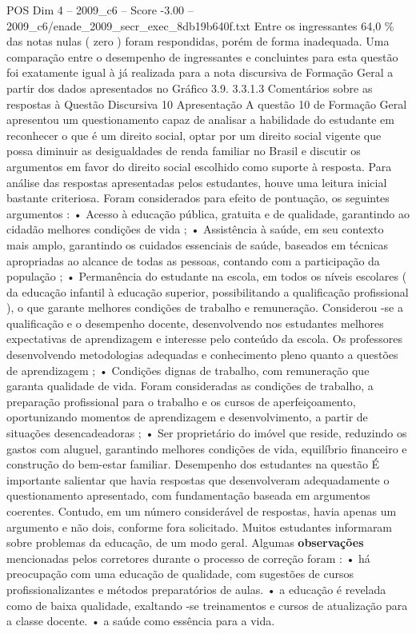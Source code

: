 \begin{textsample}{POS Dim 4 – 2009\_c6 – Score -3.00 – 2009\_c6/enade\_2009\_secr\_exec\_8db19b640f.txt}
Entre os ingressantes 64,0 \% das notas nulas ( zero ) foram respondidas, porém de forma inadequada.
Uma comparação entre o desempenho de ingressantes e concluintes para esta questão foi exatamente igual à já realizada para a nota discursiva de Formação Geral a partir dos dados apresentados no Gráfico 3.9. 3.3.1.3 Comentários sobre as respostas à Questão Discursiva 10 Apresentação A questão 10 de Formação Geral apresentou um questionamento capaz de analisar a habilidade do estudante em reconhecer o que é um direito social, optar por um direito social vigente que possa diminuir as desigualdades de renda familiar no Brasil e discutir os argumentos em favor do direito social escolhido como suporte à resposta.
Para análise das respostas apresentadas pelos estudantes, houve uma leitura inicial bastante criteriosa.
Foram considerados para efeito de pontuação, os seguintes argumentos : • Acesso à educação pública, gratuita e de qualidade, garantindo ao cidadão melhores condições de vida ; • Assistência à saúde, em seu contexto mais amplo, garantindo os cuidados essenciais de saúde, baseados em técnicas apropriadas ao alcance de todas as pessoas, contando com a participação da população ; • Permanência do estudante na escola, em todos os níveis escolares ( da educação infantil à educação superior, possibilitando a qualificação profissional ), o que garante melhores condições de trabalho e remuneração.
Considerou -se a qualificação e o desempenho docente, desenvolvendo nos estudantes melhores expectativas de aprendizagem e interesse pelo conteúdo da escola.
Os professores desenvolvendo metodologias adequadas e conhecimento pleno quanto a questões de aprendizagem ; • Condições dignas de trabalho, com remuneração que garanta qualidade de vida.
Foram consideradas as condições de trabalho, a preparação profissional para o trabalho e os cursos de aperfeiçoamento, oportunizando momentos de aprendizagem e desenvolvimento, a partir de situações desencadeadoras ; • Ser proprietário do imóvel que reside, reduzindo os gastos com aluguel, garantindo melhores condições de vida, equilíbrio financeiro e construção do bem-estar familiar.
Desempenho dos estudantes na questão É importante salientar que havia respostas que desenvolveram adequadamente o questionamento apresentado, com fundamentação baseada em argumentos coerentes.
Contudo, em um número considerável de respostas, havia apenas um argumento e não dois, conforme fora solicitado.
Muitos estudantes informaram sobre problemas da educação, de um modo geral.
Algumas \textbf{observações} mencionadas pelos corretores durante o processo de correção foram : • há preocupação com uma educação de qualidade, com sugestões de cursos profissionalizantes e métodos preparatórios de aulas. • a educação é revelada como de baixa qualidade, exaltando -se treinamentos e cursos de atualização para a classe docente. • a saúde como essência para a vida.

\end{textsample}

